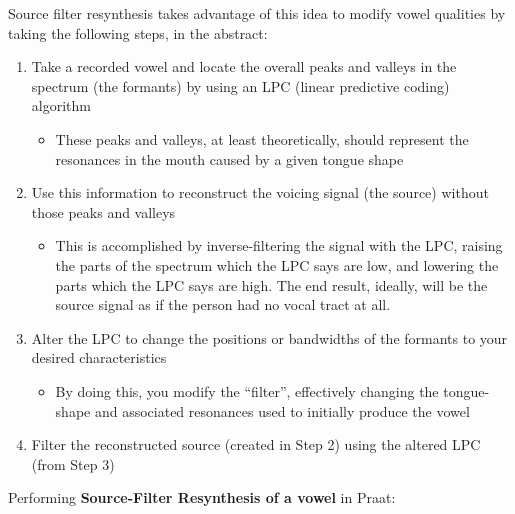 \documentclass[11pt]{article}
\def\tightlist{}
\begin{document}
Source filter resynthesis takes advantage of this idea to modify vowel
qualities by taking the following steps, in the abstract:

\begin{enumerate}
\def\labelenumi{\arabic{enumi}.}
\tightlist
\item
  Take a recorded vowel and locate the overall peaks and valleys in the
  spectrum (the formants) by using an LPC (linear predictive coding)
  algorithm

  \begin{itemize}
  \tightlist
  \item
    These peaks and valleys, at least theoretically, should represent
    the resonances in the mouth caused by a given tongue shape
  \end{itemize}
\item
  Use this information to reconstruct the voicing signal (the source)
  without those peaks and valleys

  \begin{itemize}
  \tightlist
  \item
    This is accomplished by inverse-filtering the signal with the LPC,
    raising the parts of the spectrum which the LPC says are low, and
    lowering the parts which the LPC says are high. The end result,
    ideally, will be the source signal as if the person had no vocal
    tract at all.
  \end{itemize}
\item
  Alter the LPC to change the positions or bandwidths of the formants to
  your desired characteristics

  \begin{itemize}
  \tightlist
  \item
    By doing this, you modify the ``filter'', effectively changing the
    tongue-shape and associated resonances used to initially produce the
    vowel
  \end{itemize}
\item
  Filter the reconstructed source (created in Step 2) using the altered
  LPC (from Step 3)
\end{enumerate}

Performing \textbf{Source-Filter Resynthesis of a vowel} in Praat:
\end{document}
